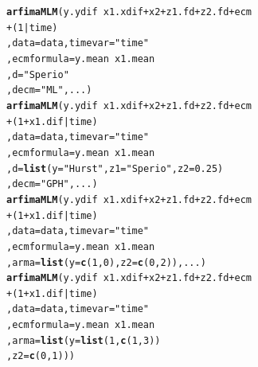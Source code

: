 \documentclass[12pt]{paper}\usepackage[]{graphicx}\usepackage[]{color}
\makeatletter
\newcommand{\hlnum}[1]{\textcolor[rgb]{0.686,0.059,0.569}{#1}}%
\newcommand{\hlstr}[1]{\textcolor[rgb]{0.192,0.494,0.8}{#1}}%
\newcommand{\hlopt}[1]{\textcolor[rgb]{0,0,0}{#1}}%
\newcommand{\hlstd}[1]{\textcolor[rgb]{0.345,0.345,0.345}{#1}}%
\newcommand{\hlkwc}[1]{\textcolor[rgb]{0.333,0.667,0.333}{#1}}%
\newcommand{\hlkwd}[1]{\textcolor[rgb]{0.737,0.353,0.396}{\textbf{#1}}}%
\newenvironment{kframe}{%
 \def\at@end@of@kframe{}%
 \ifinner\ifhmode%
  \def\at@end@of@kframe{\end{minipage}}%
  \begin{minipage}{\columnwidth}%
 \fi\fi%
 \def\FrameCommand##1{\hskip\@totalleftmargin \hskip-\fboxsep
 \colorbox{shadecolor}{##1}\hskip-\fboxsep
     \hskip-\linewidth \hskip-\@totalleftmargin \hskip\columnwidth}%
 \MakeFramed {\advance\hsize-\width
   \@totalleftmargin\z@ \linewidth\hsize
   \@setminipage}}%
 {\par\unskip\endMakeFramed%
 \at@end@of@kframe}
\newenvironment{knitrout}{}{} %
\makeatother
\begin{document}
\begin{knitrout}
\color{fgcolor}\begin{kframe}
\begin{alltt}
\hlkwd{arfimaMLM}\hlstd{(y.ydif} \hlopt{~} \hlstd{x1.xdif} \hlopt{+} \hlstd{x2} \hlopt{+} \hlstd{z1.fd} \hlopt{+} \hlstd{z2.fd} \hlopt{+} \hlstd{ecm}
          \hlopt{+} \hlstd{(}\hlnum{1}\hlopt{|}\hlstd{time)}
          \hlstd{,} \hlkwc{data}\hlstd{=data,} \hlkwc{timevar} \hlstd{=} \hlstr{"time"}
          \hlstd{,} \hlkwc{ecmformula} \hlstd{= y.mean} \hlopt{~} \hlstd{x1.mean}
          \hlstd{,} \hlkwc{d}\hlstd{=}\hlstr{"Sperio"}
          \hlstd{,} \hlkwc{decm}\hlstd{=}\hlstr{"ML"}\hlstd{, ...)}
\hlkwd{arfimaMLM}\hlstd{(y.ydif} \hlopt{~} \hlstd{x1.xdif} \hlopt{+} \hlstd{x2} \hlopt{+} \hlstd{z1.fd} \hlopt{+} \hlstd{z2.fd} \hlopt{+} \hlstd{ecm}
          \hlopt{+} \hlstd{(}\hlnum{1}\hlopt{+}\hlstd{x1.dif}\hlopt{|}\hlstd{time)}
          \hlstd{,} \hlkwc{data}\hlstd{=data,} \hlkwc{timevar} \hlstd{=} \hlstr{"time"}
          \hlstd{,} \hlkwc{ecmformula} \hlstd{= y.mean} \hlopt{~} \hlstd{x1.mean}
          \hlstd{,} \hlkwc{d}\hlstd{=}\hlkwd{list}\hlstd{(}\hlkwc{y}\hlstd{=}\hlstr{"Hurst"}\hlstd{,} \hlkwc{z1}\hlstd{=}\hlstr{"Sperio"}\hlstd{,} \hlkwc{z2}\hlstd{=}\hlnum{0.25}\hlstd{)}
          \hlstd{,} \hlkwc{decm}\hlstd{=}\hlstr{"GPH"}\hlstd{, ...)}
\hlkwd{arfimaMLM}\hlstd{(y.ydif} \hlopt{~} \hlstd{x1.xdif} \hlopt{+} \hlstd{x2} \hlopt{+} \hlstd{z1.fd} \hlopt{+} \hlstd{z2.fd} \hlopt{+} \hlstd{ecm}
          \hlopt{+} \hlstd{(}\hlnum{1}\hlopt{+}\hlstd{x1.dif}\hlopt{|}\hlstd{time)}
          \hlstd{,} \hlkwc{data}\hlstd{=data,} \hlkwc{timevar} \hlstd{=} \hlstr{"time"}
          \hlstd{,} \hlkwc{ecmformula} \hlstd{= y.mean} \hlopt{~} \hlstd{x1.mean}
          \hlstd{,} \hlkwc{arma} \hlstd{=} \hlkwd{list}\hlstd{(}\hlkwc{y} \hlstd{=} \hlkwd{c}\hlstd{(}\hlnum{1}\hlstd{,}\hlnum{0}\hlstd{),} \hlkwc{z2} \hlstd{=} \hlkwd{c}\hlstd{(}\hlnum{0}\hlstd{,}\hlnum{2}\hlstd{)), ...)}
\hlkwd{arfimaMLM}\hlstd{(y.ydif} \hlopt{~} \hlstd{x1.xdif} \hlopt{+} \hlstd{x2} \hlopt{+} \hlstd{z1.fd} \hlopt{+} \hlstd{z2.fd} \hlopt{+} \hlstd{ecm}
          \hlopt{+} \hlstd{(}\hlnum{1}\hlopt{+}\hlstd{x1.dif}\hlopt{|}\hlstd{time)}
          \hlstd{,} \hlkwc{data}\hlstd{=data,} \hlkwc{timevar} \hlstd{=} \hlstr{"time"}
          \hlstd{,} \hlkwc{ecmformula} \hlstd{= y.mean} \hlopt{~} \hlstd{x1.mean}
          \hlstd{,} \hlkwc{arma} \hlstd{=} \hlkwd{list}\hlstd{(}\hlkwc{y} \hlstd{=} \hlkwd{list}\hlstd{(}\hlnum{1}\hlstd{,}\hlkwd{c}\hlstd{(}\hlnum{1}\hlstd{,}\hlnum{3}\hlstd{))}
                        \hlstd{,} \hlkwc{z2} \hlstd{=} \hlkwd{c}\hlstd{(}\hlnum{0}\hlstd{,}\hlnum{1}\hlstd{)))}
\end{alltt}
\end{kframe}
\end{knitrout}
\end{document}
